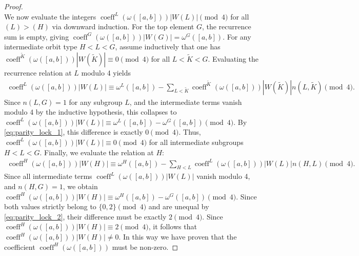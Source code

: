 \documentclass[twoside]{article}%
\def\wt{\widetilde}
\begin{document}
\begin{proof}
\begin{equation}
\end{equation}
We now evaluate the integers $\operatorname{coeff}^L ( \omega([a,b]) ) |W(L)| \pmod 4$ for all $(L) > (H)$ via downward induction. For the top element $G$, the recurrence sum is empty, giving $\operatorname{coeff}^G ( \omega([a,b]) ) |W(G)| = \omega^G([a,b])$. For any intermediate orbit type $H < L < G$, assume inductively that one has $\operatorname{coeff}^{\wt K} ( \omega([a,b]) ) |W(\tilde K)| \equiv 0 \pmod 4$ for all $L < \tilde K < G$. Evaluating the recurrence relation at $L$ modulo 4 yields
\begin{align*}
 \operatorname{coeff}^L ( \omega([a,b]) )|W(L)|  \equiv \omega^L([a,b]) - \sum_{L < \tilde K} \operatorname{coeff}^{\wt K} ( \omega([a,b]) ) |W(\tilde K)| n(L, \tilde K) \pmod 4.    
\end{align*}
Since $n(L,G) = 1$ for any subgroup $L$, and the intermediate terms vanish modulo 4 by the inductive hypothesis, this collapses to $\operatorname{coeff}^L ( \omega([a,b]) ) |W(L)| \equiv \omega^L([a,b]) - \omega^G([a,b]) \pmod 4$. By \eqref{eq:parity_lock_1}, this difference is exactly $0 \pmod 4$. Thus, $\operatorname{coeff}^L ( \omega([a,b]) ) |W(L)| \equiv 0 \pmod 4$ for all intermediate subgroups $H < L < G$.
Finally, we evaluate the relation at $H$:
\begin{align*}
\operatorname{coeff}^H ( \omega([a,b]) ) |W(H)| \equiv \omega^H([a,b]) - \sum_{H < L} \operatorname{coeff}^L ( \omega([a,b]) ) |W(L)| n(H,L) \pmod 4.    
\end{align*}
Since all intermediate terms $\operatorname{coeff}^L ( \omega([a,b]) ) |W(L)|$ vanish modulo 4, and $n(H,G) = 1$, we obtain $\operatorname{coeff}^H ( \omega([a,b]) ) |W(H)| \equiv \omega^H([a,b]) - \omega^G([a,b]) \pmod 4$. Since both values strictly belong to $\{0, 2\} \pmod 4$ and are unequal by \eqref{eq:parity_lock_2}, their difference must be exactly $2 \pmod 4$. Since $\operatorname{coeff}^H ( \omega([a,b]) ) |W(H)| \equiv 2 \pmod 4$, it follows that $\operatorname{coeff}^H ( \omega([a,b]) ) |W(H)| \neq 0$. In this way we have proven that the coefficient $\operatorname{coeff}^H(\omega([a,b]))$ must be non-zero.
\end{proof}
\end{document}
